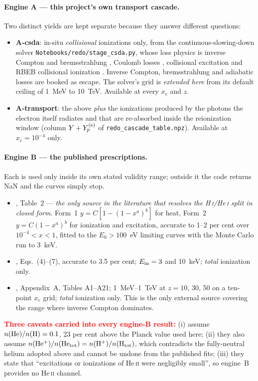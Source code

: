 \documentclass[11pt,a4paper]{article}
\newcommand{\flag}[1]{\textbf{\textcolor{red}{#1}}}
\begin{document}
\paragraph{Engine A --- this project's own transport cascade.}
Two distinct yields are kept separate because they answer different questions:
\begin{itemize}\itemsep2pt
  \item \textbf{A-csda}: in-situ \emph{collisional} ionizations only, from the
  continuous-slowing-down solver \texttt{Notebooks/\allowbreak redo/\allowbreak stage\_csda.py}, whose
  loss physics is inverse Compton and bremsstrahlung
  \citep{BlumenthalGould1970}, Coulomb losses \citep{Gould1972}, collisional
  excitation \citep{StoneKim2002} and RBEB collisional ionization
  \citep{Kim2000}.  Inverse Compton, bremsstrahlung and adiabatic losses are
  booked as escape.  The solver's grid is \emph{extended here} from its
  default ceiling of 1~MeV to 10~TeV.  Available at every $x_e$ and $z$.
  \item \textbf{A-transport}: the above \emph{plus} the ionizations produced by
  the photons the electron itself radiates and that are re-absorbed inside the
  reionization window (column $Y+Y_p^{\rm(e)}$ of
  \texttt{redo\_\allowbreak cascade\_\allowbreak table.npz}).  Available at $x_e=10^{-4}$ only.
\end{itemize}
\paragraph{Engine B --- the published prescriptions.}
Each is used only inside its own stated validity range; outside it the code
returns NaN and the curves simply stop.
\begin{itemize}\itemsep2pt
  \item \citet{ShullVanSteenberg1985}, Table~2 --- \emph{the only source in the
  literature that resolves the H\,\textsc{i}/He\,\textsc{i} split in closed
  form}.  Form~1 $y=C[1-(1-x^a)^b]$ for heat, Form~2 $y=C(1-x^a)^b$ for
  ionization and excitation, accurate to 1--2 per cent over
  $10^{-4}<x<1$, fitted to the $E_0>100$~eV limiting curves with the Monte
  Carlo run to 3~keV.
  \item \citet{ValdesFerrara2008}, Eqs.~(4)--(7), accurate to 3.5 per cent;
  $E_{\rm in}=3$ and 10~keV; \emph{total} ionization only.
  \item \citet{Valdes2010}, Appendix~A, Tables A1--A21; 1~MeV--1~TeV at
  $z=10$, 30, 50 on a ten-point $x_e$ grid; \emph{total} ionization only.
  This is the only external source covering the range where inverse Compton
  dominates.
\end{itemize}
\flag{Three caveats carried into every engine-B result:}
(i) \citet{ShullVanSteenberg1985} assume $n({\rm He})/n({\rm H})=0.1$, 23 per
cent above the Planck value used here;
(ii) they also assume $n({\rm He^+})/n({\rm He_{tot}}) = n({\rm H^+})/n({\rm
H_{tot}})$, which contradicts the fully-neutral helium adopted above and
cannot be undone from the published fits;
(iii) they state that ``excitations or ionizations of He\,\textsc{ii} were
negligibly small'', so engine~B provides no He\,\textsc{ii} channel.
\end{document}
